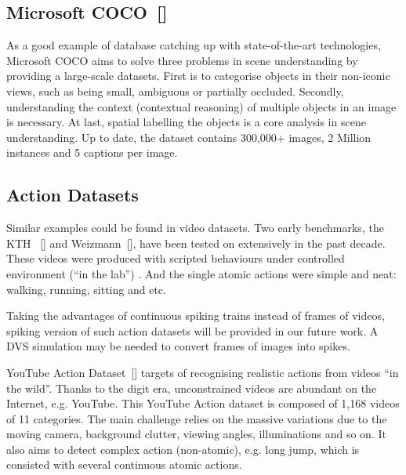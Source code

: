 \subsection{Microsoft COCO~[\cite{lin_microsoft_2014}]}
As a good example of database catching up with state-of-the-art technologies, Microsoft COCO aims to solve three problems in scene understanding by providing a large-scale datasets.
First is to categorise objects in their non-iconic views, such as being small, ambiguous or partially occluded.
Secondly, understanding the context (contextual reasoning) of multiple objects in an image is necessary.
At last, spatial labelling the objects is a core analysis in scene understanding.
Up to date, the dataset contains 300,000+ images, 2 Million instances and 5 captions per image.

\subsection{Action Datasets}
Similar examples could be found in video datasets.
Two early benchmarks, the KTH ~[\cite{schuldt2004recognizing}] and Weizmann~[\cite{blank2005actions}], have been tested on extensively in the past decade. 
These videos were produced with scripted behaviours under controlled environment (``in the lab'') .
And the single atomic actions were simple and neat: walking, running, sitting and etc.

Taking the advantages of continuous spiking trains instead of frames of videos, spiking version of such action datasets will be provided in our future work.
A DVS simulation may be needed to convert frames of images into spikes.
 
YouTube Action Dataset~[\cite{liu_recognizing_2009}] targets of recognising realistic actions from videos ``in the wild''.
Thanks to the digit era, unconstrained videos are abundant on the Internet, e.g. YouTube.
This YouTube Action dataset is composed of 1,168 videos of 11 categories.
The main challenge relies on the massive variations due to the moving camera, background clutter, viewing angles, illuminations and so on.
It also aims to detect complex action (non-atomic), e.g. long jump, which is consisted with several continuous atomic actions.

